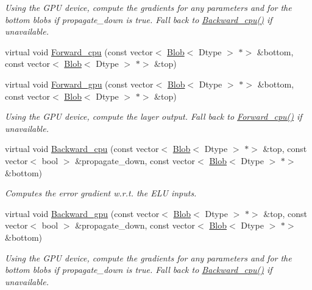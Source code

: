 \begin{DoxyCompactItemize}
\begin{DoxyCompactList}\small\item\em Using the G\+PU device, compute the gradients for any parameters and for the bottom blobs if propagate\+\_\+down is true. Fall back to \mbox{\hyperlink{classcaffe_1_1_e_l_u_layer_a606284cd2e5ff40154ff0865a100b940}{Backward\+\_\+cpu()}} if unavailable. \end{DoxyCompactList}\item 
virtual void \mbox{\hyperlink{classcaffe_1_1_e_l_u_layer_a8020273613906e572c3ff5d8d71eb1a7}{Forward\+\_\+cpu}} (const vector$<$ \mbox{\hyperlink{classcaffe_1_1_blob}{Blob}}$<$ Dtype $>$ $\ast$$>$ \&bottom, const vector$<$ \mbox{\hyperlink{classcaffe_1_1_blob}{Blob}}$<$ Dtype $>$ $\ast$$>$ \&top)
\item 
\mbox{\label{classcaffe_1_1_e_l_u_layer_adf358202203d0735dff3275d6f668a00}} 
virtual void \mbox{\hyperlink{classcaffe_1_1_e_l_u_layer_adf358202203d0735dff3275d6f668a00}{Forward\+\_\+gpu}} (const vector$<$ \mbox{\hyperlink{classcaffe_1_1_blob}{Blob}}$<$ Dtype $>$ $\ast$$>$ \&bottom, const vector$<$ \mbox{\hyperlink{classcaffe_1_1_blob}{Blob}}$<$ Dtype $>$ $\ast$$>$ \&top)
\begin{DoxyCompactList}\small\item\em Using the G\+PU device, compute the layer output. Fall back to \mbox{\hyperlink{classcaffe_1_1_e_l_u_layer_a041f6109649dfb97dff80c0d6364c20d}{Forward\+\_\+cpu()}} if unavailable. \end{DoxyCompactList}\item 
virtual void \mbox{\hyperlink{classcaffe_1_1_e_l_u_layer_ac3255079492bf76587dc558a449ea0d8}{Backward\+\_\+cpu}} (const vector$<$ \mbox{\hyperlink{classcaffe_1_1_blob}{Blob}}$<$ Dtype $>$ $\ast$$>$ \&top, const vector$<$ bool $>$ \&propagate\+\_\+down, const vector$<$ \mbox{\hyperlink{classcaffe_1_1_blob}{Blob}}$<$ Dtype $>$ $\ast$$>$ \&bottom)
\begin{DoxyCompactList}\small\item\em Computes the error gradient w.\+r.\+t. the E\+LU inputs. \end{DoxyCompactList}\item 
\mbox{\label{classcaffe_1_1_e_l_u_layer_a0dc9a42bb095c77df19118da60198a1e}} 
virtual void \mbox{\hyperlink{classcaffe_1_1_e_l_u_layer_a0dc9a42bb095c77df19118da60198a1e}{Backward\+\_\+gpu}} (const vector$<$ \mbox{\hyperlink{classcaffe_1_1_blob}{Blob}}$<$ Dtype $>$ $\ast$$>$ \&top, const vector$<$ bool $>$ \&propagate\+\_\+down, const vector$<$ \mbox{\hyperlink{classcaffe_1_1_blob}{Blob}}$<$ Dtype $>$ $\ast$$>$ \&bottom)
\begin{DoxyCompactList}\small\item\em Using the G\+PU device, compute the gradients for any parameters and for the bottom blobs if propagate\+\_\+down is true. Fall back to \mbox{\hyperlink{classcaffe_1_1_e_l_u_layer_a606284cd2e5ff40154ff0865a100b940}{Backward\+\_\+cpu()}} if unavailable. \end{DoxyCompactList}\end{DoxyCompactItemize}
